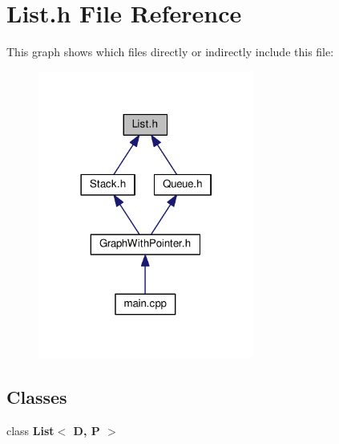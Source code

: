 \section{List.\-h File Reference}
\label{_list_8h}
This graph shows which files directly or indirectly include this file\-:
\nopagebreak
\begin{figure}[H]
\begin{center}
\leavevmode
\includegraphics[width=201pt]{_list_8h__dep__incl}
\end{center}
\end{figure}
\subsection*{Classes}
\begin{DoxyCompactItemize}
\item 
class {\bf List$<$ D, P $>$}
\end{DoxyCompactItemize}
